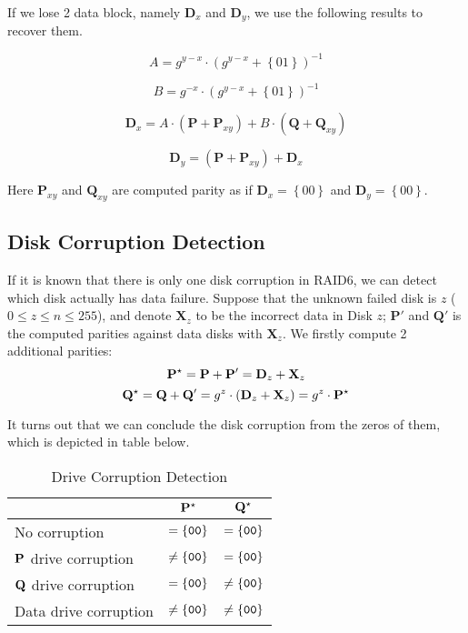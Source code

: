 If we lose 2 data block, namely $\mathbf{D}_x$ and $\mathbf{D}_y$, we use the following results to recover them.

\begin{equation}
	A = g^{y-x}\cdot (g^{y-x}+\left\{01\right\})^{-1}
\end{equation}

\begin{equation}
	B = g^{-x}\cdot(g^{y-x}+\left\{01\right\})^{-1}
\end{equation}

\begin{equation}
	\mathbf{D}_{x} = A\cdot (\mathbf{P}+\mathbf{P}_{xy}) + B\cdot (\mathbf{Q}+\mathbf{Q}_{xy})
\end{equation}

\begin{equation}
	\mathbf{D}_{y} = (\mathbf{P}+\mathbf{P}_{xy}) + \mathbf{D}_x
\end{equation}

Here $\mathbf{P}_{xy}$ and $\mathbf{Q}_{xy}$ are computed parity as if $\mathbf{D}_x=\left\{00\right\}$ and $\mathbf{D}_y=\left\{00\right\}$.


\subsection{Disk Corruption Detection}

If it is known that there is only one disk corruption in RAID6, we can detect which disk actually has data failure. Suppose that the unknown failed disk is $z$ ($0\leq z\leq n\leq 255$), and denote $\mathbf{X}_z$ to be the incorrect data in Disk $z$; $\mathbf{P}'$ and $\mathbf{Q}'$ is the computed parities against data disks with $\mathbf{X}_z$. We firstly compute 2 additional parities:
\begin{equation}
  \Pstar = \mathbf{P} + \mathbf{P}'=\mathbf{D}_z+\mathbf{X}_z
\end{equation}
\begin{equation}
  \Qstar = \mathbf{Q} + \mathbf{Q}'=g^{z}\cdot (\mathbf{D}_z+\mathbf{X}_z)=g^z\cdot \mathbf{\Pstar}
\end{equation}

It turns out that we can conclude the disk corruption from the zeros of them, which is depicted in table below.

\begin{table}[H]
  \caption{Drive Corruption Detection}
\begin{center}
\def\tmp#1{\multicolumn{1}{|l|}{#1}}
\begin{tabular}{l|c|c|} \cline{2-3}
& $\Pstar$ & $\Qstar$ \\ \hline
\tmp{No corruption} & $= \g{00}$ & $= \g{00}$ \\ \hline
\tmp{$\P$ drive corruption} & $\not= \g{00}$ & $= \g{00}$ \\ \hline
\tmp{$\Q$ drive corruption} & $= \g{00}$ & $\not= \g{00}$ \\ \hline
\tmp{Data drive corruption} & $\not= \g{00}$ & $\not= \g{00}$ \\ \hline
\end{tabular}
\end{center}
\end{table}

